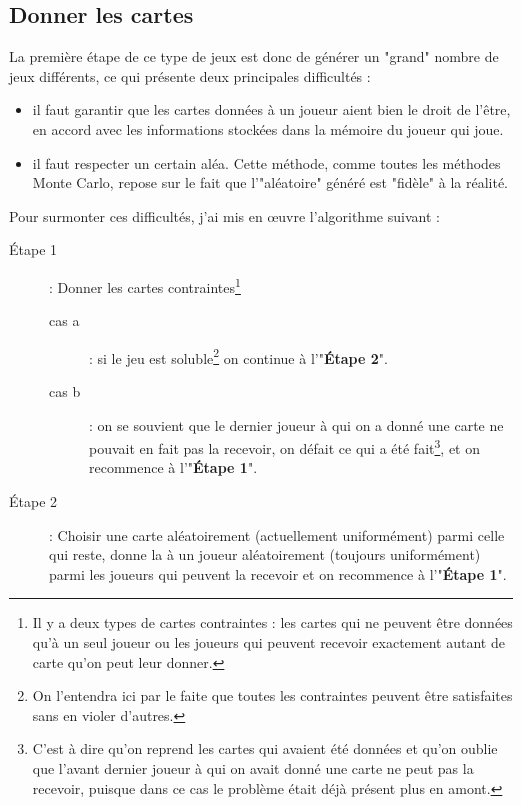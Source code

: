 \documentclass[a4paper,11pt]{article}
\begin{document}
\subsection{Donner les cartes \label{sec:giveCards}}
La première étape de ce type de jeux est donc de générer un "grand" nombre de jeux différents, ce qui présente deux principales difficultés :
\begin{itemize}
\item il faut garantir que les cartes données à un joueur aient bien le droit de l'être, en accord avec les informations stockées dans la mémoire du joueur qui joue.
\item il faut respecter un certain aléa. Cette méthode, comme toutes les méthodes Monte Carlo, repose sur le fait que l'"aléatoire" généré est "fidèle" à la réalité. \\
\end{itemize}

Pour surmonter ces difficultés, j'ai mis en \oe{}uvre l'algorithme suivant :
\begin{description}
\item[\'Etape 1] : Donner les cartes contraintes\footnote{Il y a deux types de cartes contraintes : les cartes qui ne peuvent être données qu'à un seul joueur ou les joueurs qui peuvent recevoir exactement autant de carte qu'on peut leur donner.}
\begin{description}
\item[cas a] : si le jeu est soluble\footnote{On l'entendra ici par le faite que toutes les contraintes peuvent être satisfaites sans en violer d'autres.} on continue à l'"\textbf{\'Etape 2}".
\item[cas b] : on se souvient que le dernier joueur à qui on a donné une carte ne pouvait en fait pas la recevoir, on défait ce qui a été fait\footnote{C'est à dire qu'on reprend les cartes qui avaient été données et qu'on oublie que l'avant dernier joueur à qui on avait donné une carte ne peut pas la recevoir, puisque dans ce cas le problème était déjà présent plus en amont.}, et on recommence à l'"\textbf{\'Etape 1}".
\end{description}
\item[\'Etape 2] : Choisir une carte aléatoirement (actuellement uniformément) parmi celle qui reste, donne la à un joueur aléatoirement (toujours uniformément) parmi les joueurs qui peuvent la recevoir et on recommence à l'"\textbf{\'Etape 1}". \\
\end{description}
\end{document}

